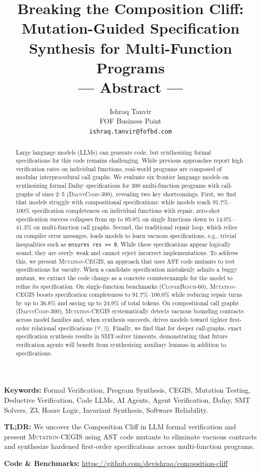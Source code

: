 \documentclass{article}
\title{Breaking the Composition Cliff: Mutation-Guided Specification Synthesis for Multi-Function Programs\\[0.5em] \large \mdseries --- Abstract ---}
\author{%
  Ishraq Tanvir \\
  FOF Business Point \\
  \texttt{ishraq.tanvir@fofbd.com} \\
}
\begin{document}
\maketitle

\begin{abstract}
Large language models (LLMs) can generate code, but synthesizing formal specifications for this code remains challenging. While previous approaches report high verification rates on individual functions, real-world programs are composed of modular interprocedural call graphs. We evaluate six frontier language models on synthesizing formal Dafny specifications for 300 multi-function programs with call-graphs of sizes 2--5 (\textsc{DafnyComp-300}), revealing two key shortcomings. First, we find that models struggle with compositional specifications: while models reach 91.7\%--100\% specification completeness on individual functions with repair, zero-shot specification success collapses from up to 95.0\% on single functions down to 14.0\%--41.3\% on multi-function call graphs. Second, the traditional repair loop, which relies on compiler error messages, leads models to learn vacuous specifications, e.g., trivial inequalities such as \texttt{ensures res >= 0}. While these specifications appear logically sound, they are overly weak and cannot reject incorrect implementations. To address this, we present \textsc{Mutation-CEGIS}, an approach that uses AST code mutants to test specifications for vacuity. When a candidate specification mistakenly admits a buggy mutant, we extract the code change as a concrete counterexample for the model to refine its specification. On single-function benchmarks (\textsc{CloverBench-60}), \textsc{Mutation-CEGIS} boosts specification completeness to 91.7\%--100.0\% while reducing repair turns by up to 36.8\% and saving up to 24.9\% of total tokens. On compositional call graphs (\textsc{DafnyComp-300}), \textsc{Mutation-CEGIS} systematically detects vacuous bounding contracts across model families and, when synthesis succeeds, drives models toward tighter first-order relational specifications ($\forall, \exists$). Finally, we find that for deeper call-graphs, exact specification synthesis results in SMT-solver timeouts, demonstrating that future verification agents will benefit from synthesizing auxiliary lemmas in addition to specifications.
\end{abstract}

\vspace{2em}
\noindent\textbf{Keywords:} Formal Verification, Program Synthesis, CEGIS, Mutation Testing, Deductive Verification, Code LLMs, AI Agents, Agent Verification, Dafny, SMT Solvers, Z3, Hoare Logic, Invariant Synthesis, Software Reliability.

\vspace{1em}
\noindent\textbf{TL;DR:} We uncover the Composition Cliff in LLM formal verification and present \textsc{Mutation-CEGIS} using AST code mutants to eliminate vacuous contracts and synthesize hardened first-order specifications across multi-function programs.

\vspace{1em}
\noindent\textbf{Code \& Benchmarks:} \url{https://github.com/devishraq/composition-cliff}
\end{document}
